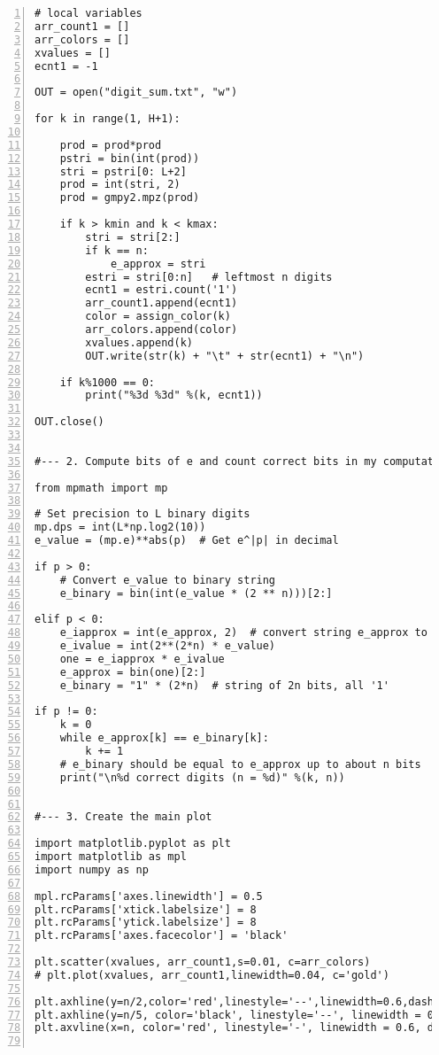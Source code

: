 \documentclass[10pt]{article}
\begin{document}
\begin{lstlisting}[numbers=left]
# local variables
arr_count1 = []
arr_colors = []
xvalues = []
ecnt1 = -1

OUT = open("digit_sum.txt", "w")

for k in range(1, H+1): 

    prod = prod*prod
    pstri = bin(int(prod))
    stri = pstri[0: L+2]  
    prod = int(stri, 2)
    prod = gmpy2.mpz(prod) 

    if k > kmin and k < kmax:   
        stri = stri[2:]
        if k == n:
            e_approx = stri
        estri = stri[0:n]   # leftmost n digits
        ecnt1 = estri.count('1')
        arr_count1.append(ecnt1)
        color = assign_color(k)
        arr_colors.append(color)
        xvalues.append(k)
        OUT.write(str(k) + "\t" + str(ecnt1) + "\n")
 
    if k%1000 == 0:
        print("%3d %3d" %(k, ecnt1))

OUT.close()


#--- 2. Compute bits of e and count correct bits in my computation

from mpmath import mp

# Set precision to L binary digits
mp.dps = int(L*np.log2(10))
e_value = (mp.e)**abs(p)  # Get e^|p| in decimal

if p > 0:
    # Convert e_value to binary string
    e_binary = bin(int(e_value * (2 ** n)))[2:] 

elif p < 0: 
    e_iapprox = int(e_approx, 2)  # convert string e_approx to integer
    e_ivalue = int(2**(2*n) * e_value)
    one = e_iapprox * e_ivalue
    e_approx = bin(one)[2:]  
    e_binary = "1" * (2*n)  # string of 2n bits, all '1'

if p != 0:
    k = 0
    while e_approx[k] == e_binary[k]:
        k += 1
    # e_binary should be equal to e_approx up to about n bits  
    print("\n%d correct digits (n = %d)" %(k, n))


#--- 3. Create the main plot

import matplotlib.pyplot as plt
import matplotlib as mpl
import numpy as np

mpl.rcParams['axes.linewidth'] = 0.5
plt.rcParams['xtick.labelsize'] = 8
plt.rcParams['ytick.labelsize'] = 8
plt.rcParams['axes.facecolor'] = 'black'

plt.scatter(xvalues, arr_count1,s=0.01, c=arr_colors) 
# plt.plot(xvalues, arr_count1,linewidth=0.04, c='gold') 

plt.axhline(y=n/2,color='red',linestyle='--',linewidth=0.6,dashes=(5,10))   
plt.axhline(y=n/5, color='black', linestyle='--', linewidth = 0.6, dashes=(5, 10))
plt.axvline(x=n, color='red', linestyle='-', linewidth = 0.6, dashes=(5, 10))


\end{lstlisting}
\end{document}
